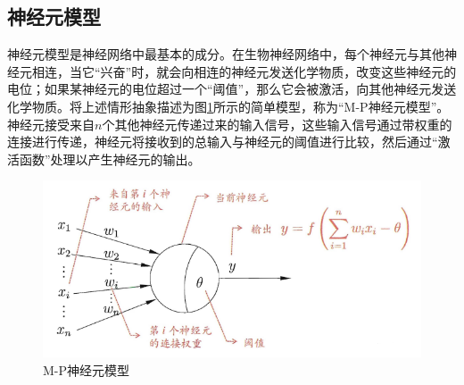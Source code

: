 \documentclass[zihao = -4,cn]{oucart}
\begin{document}
\subsection{神经元模型}
神经元模型是神经网络中最基本的成分。在生物神经网络中，每个神经元与其他神经元相连，当它“兴奋”时，就会向相连的神经元发送化学物质，改变这些神经元的电位；如果某神经元的电位超过一个“阈值”，那么它会被激活，向其他神经元发送化学物质。将上述情形抽象描述为图\ref{fig:unit}所示的简单模型，称为“M-P神经元模型”。神经元接受来自$n$个其他神经元传递过来的输入信号，这些输入信号通过带权重的连接进行传递，神经元将接收到的总输入与神经元的阈值进行比较，然后通过“激活函数”处理以产生神经元的输出。
\begin{figure}[h]
	\centering %
	\includegraphics[scale=0.7]{assets/unit}
	\caption{M-P神经元模型}
	\label{fig:unit}
\end{figure}
\end{document}
